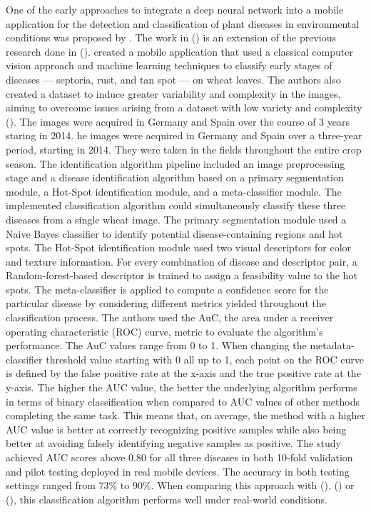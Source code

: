 \documentclass{BachelorBUI}
\begin{document}
One of the early approaches to integrate a deep neural network into a mobile application for the detection and classification of plant diseases in environmental conditions was proposed by \cite{Picon:2019}. The work in (\cite{Picon:2019}) is an extension of the previous research done in (\cite{Johannes:2017}). \textcite{Johannes:2017} created a mobile application that used a classical computer vision approach and machine learning techniques to classify early stages of diseases --- septoria, rust, and tan spot --- on wheat leaves. The authors also created a dataset to induce greater variability and complexity in the images, aiming to overcome issues arising from a dataset with low variety and complexity (\cite{Mohanty:2016,Ferentinos:2018}). The images were acquired in Germany and Spain over the course of 3 years staring in 2014. he images were acquired in Germany and Spain over a three-year period, starting in 2014. They were taken in the fields throughout the entire crop season. The identification algorithm pipeline included an image preprocessing stage and a disease identification algorithm based on a primary segmentation module, a Hot-Spot identification module, and a meta-classifier module. The implemented classification algorithm could simultaneously classify these three diseases from a single wheat image. The primary segmentation module used a Naive Bayes classifier to identify potential disease-containing regions and hot spots. The Hot-Spot identification module used two visual descriptors for color and texture information. For every combination of disease and descriptor pair, a Random-forest-based descriptor is trained to assign a feasibility value to the hot spots. The meta-classifier is applied to compute a confidence score for the particular disease by considering different metrics yielded throughout the classification process. The authors used the AuC, the area under a receiver operating characteristic (ROC) curve, metric to evaluate the algorithm's performance. The AuC values range from 0 to 1. When changing the metadata-classifier threshold value starting with 0 all up to 1, each point on the ROC curve is defined by the false positive rate at the x-axis and the true positive rate at the y-axis. The higher the AUC value, the better the underlying algorithm performs in terms of binary classification when compared to AUC values of other methods completing the same task. This means that, on average, the method with a higher AUC value is better at correctly recognizing positive samples while also being better at avoiding falsely identifying negative samples as positive. The study achieved AUC scores above 0.80 for all three diseases in both 10-fold validation and pilot testing deployed in real mobile devices. The accuracy in both testing settings ranged from 73\% to 90\%. When comparing this approach with (\cite{Sladojevic:2016}), (\cite{Mohanty:2016}) or (\cite{Ferentinos:2018}), this classification algorithm performs well under real-world conditions.
\end{document}
